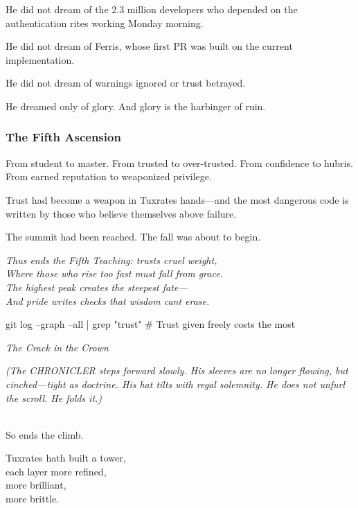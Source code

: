 He did not dream of the 2.3 million developers who depended on the authentication rites working Monday morning.

He did not dream of Ferris, whose first PR was built on the current implementation.

He did not dream of warnings ignored or trust betrayed.

He dreamed only of glory. And glory is the harbinger of ruin.

\bookdivider

\subsubsection{The Fifth Ascension}\label{the-fifth-ascension}

From student to master. From trusted to over-trusted. From confidence to hubris. From earned reputation to weaponized privilege.

Trust had become a weapon in Tuxrates\textquotesingle{} hands---and the most dangerous code is written by those who believe themselves above failure.

The summit had been reached. The fall was about to begin.

\bookdivider

\emph{Thus ends the Fifth Teaching: trust\textquotesingle s cruel weight,}\\
\emph{Where those who rise too fast must fall from grace.}\\
\emph{The highest peak creates the steepest fate---}\\
\emph{And pride writes checks that wisdom can\textquotesingle t erase.}

\begin{codeblock}
git log --graph --all | grep "trust"
# Trust given freely costs the most
\end{codeblock}

\bookdivider

\label{performing_arts-closing-of-the-scroll}

\emph{The Crack in the Crown}

\emph{(The CHRONICLER steps forward slowly. His sleeves are no longer flowing, but cinched---tight as doctrine. His hat tilts with regal solemnity. He does not unfurl the scroll. He folds it.)}

\\
So ends the climb.

Tuxrates hath built a tower,\\
each layer more refined,\\
more brilliant,\\
more brittle.

